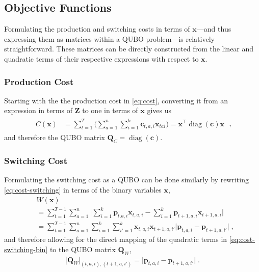 \documentclass[conference]{IEEEtran}
\makeatletter
\newcommand{\bp}{\boldsymbol{p}}
\newcommand{\bc}{\boldsymbol{c}}
\newcommand{\bZ}{\boldsymbol{Z}}
\newcommand{\bQ}{\boldsymbol{Q}}
\newcommand{\trans}{\intercal}
\newcommand{\bx}{\boldsymbol{x}}
\newcommand{\g}[1]{#1}
\DeclareMathOperator*{\diag}{diag}
\newcommand{\QUBO}{\textsc{QUBO}\@\xspace}
\makeatother
\begin{document}
\subsection{Objective Functions}
Formulating the production and switching costs in terms of $\bx$---and
thus expressing them as matrices within a {\QUBO} problem---is
relatively straightforward. These matrices can be directly constructed
from the linear and quadratic terms of their respective expressions with
respect to $\bx$.

\subsubsection{Production Cost}
Starting with the the production cost in \cref{eq:cost}, converting it
from an expression in terms of $\bZ$ to one in terms of $\bx$ gives us
\begin{gather}
  \label{eq:cost-bin}
  \begin{split}
    C(\bx)
    &= \sum_{t=1}^{T}\Biggl(
    \sum_{a=1}^{n}\sum_{i=1}^{k}\g{\bc}_{t,a,i} \g{\bx}_{tai}
      \Biggr)
    =\bx^{\trans} \diag(\g{\bc}) \bx
  \end{split}\;,
\end{gather}
and therefore the {\QUBO} matrix $\bQ_{C}=\diag(\bc)$.
\subsubsection{Switching Cost}
Formulating the switching cost as a {\QUBO} can be done similarly by
rewriting \cref{eq:cost-switching} in terms of the binary variables
$\bx$,
\begin{equation}
  \label{eq:cost-switching-bin}
  \begin{split}
    &W(\bx)\\
    &= \sum_{t=1}^{T-1}\sum_{a=1}^{n}
    \Biggl| \sum_{i=1}^{k}\g{\bp}_{t.a,i}\g{\bx}_{t,a,i} -
      \sum_{i=1}^{k}\g{\bp}_{t+1,a,i}\g{\bx}_{t+1,a,i} \Biggr|\\
    &=\sum_{t=1}^{T-1}\sum_{a=1}^{n}
      \sum_{i=1}^{k}\sum_{i'=1}^{k}
      \g{\bx}_{t,a,i} \g{\bx}_{t+1,a,i'}
      \bigl| \g{\bp}_{t,a,i} - \g{\bp}_{t+1,a,i'} \bigr|\;,
  \end{split}
\end{equation}
and therefore allowing for the direct mapping of the quadratic terms in
\cref{eq:cost-switching-bin} to the {\QUBO} matrix $\bQ_{W}$,
\begin{gather}
  \label{eq:26}
  \bigl[\bQ_{W}\bigr]_{(t,a,i),(t+1,a,i')}
  = \bigl| \g{\bp}_{t,a,i} - \g{\bp}_{t+1,a,i'} \bigr|\;.
\end{gather}
\end{document}
